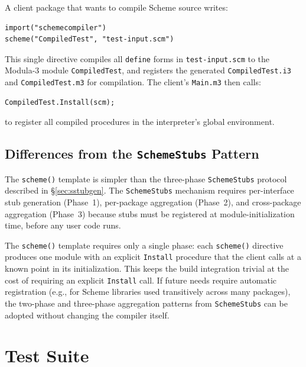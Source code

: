 \documentclass[12pt]{report}
\begin{document}
A client package that wants to compile Scheme source writes:

\begin{lstlisting}
import("schemecompiler")
scheme("CompiledTest", "test-input.scm")
\end{lstlisting}

This single directive compiles all \texttt{define} forms in
\texttt{test-input.scm} to the Modula-3 module \texttt{CompiledTest},
and registers the generated \texttt{CompiledTest.i3} and
\texttt{CompiledTest.m3} for compilation.  The client's
\texttt{Main.m3} then calls:

\begin{lstlisting}[language=Modula3]
CompiledTest.Install(scm);
\end{lstlisting}

\noindent
to register all compiled procedures in the interpreter's global
environment.

\subsection{Differences from the \texttt{SchemeStubs} Pattern}

The \texttt{scheme()} template is simpler than the three-phase
\texttt{SchemeStubs} protocol described in
\S\ref{sec:sstubgen}.  The \texttt{SchemeStubs} mechanism requires
per-interface stub generation (Phase~1), per-package aggregation
(Phase~2), and cross-package aggregation (Phase~3) because stubs must
be registered at module-initialization time, before any user code runs.

The \texttt{scheme()} template requires only a single phase: each
\texttt{scheme()} directive produces one module with an explicit
\texttt{Install} procedure that the client calls at a known point
in its initialization.  This keeps the build integration trivial at
the cost of requiring an explicit \texttt{Install} call.  If
future needs require automatic registration (e.g., for Scheme
libraries used transitively across many packages), the two-phase and
three-phase aggregation patterns from \texttt{SchemeStubs} can be
adopted without changing the compiler itself.

\section{Test Suite}
\label{sec:impl-tests}
\end{document}
